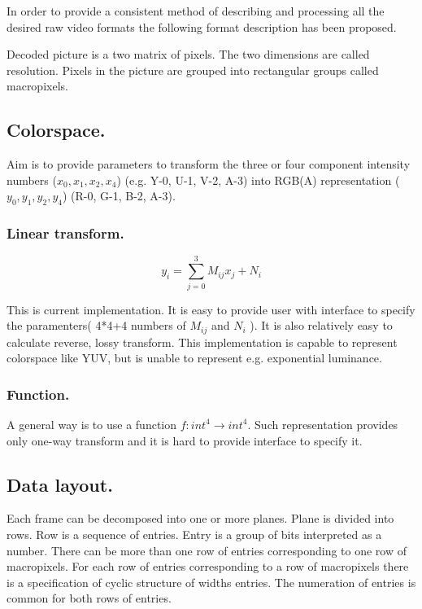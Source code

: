 In order to provide a consistent method of describing and processing all the desired raw video formats the following format description has been proposed.

Decoded picture is a two matrix of pixels. The two dimensions are called resolution. Pixels in the picture are grouped into rectangular groups called macropixels.

\subsection{Colorspace.}

Aim is to provide parameters to transform the three or four component intensity numbers ($x_0, x_1, x_2, x_4$) (e.g. Y-0, U-1, V-2, A-3) into RGB(A) representation ($y_0, y_1, y_2, y_4$) (R-0, G-1, B-2, A-3).

\subsubsection{Linear transform.}

\begin{displaymath}
y_i = \sum_{j=0}^3 M_{ij} x_j + N_i
\end{displaymath}

This is current implementation. It is easy to provide user with interface to specify the paramenters( 4*4+4 numbers of $M_{ij}$ and $N_i$ ). It is also relatively easy to calculate reverse, lossy transform. This implementation is capable to represent colorspace like YUV, but is unable to represent e.g. exponential luminance.

\subsubsection{Function.}

A general way is to use a function $f:int^4 \rightarrow int^4$. Such representation provides only one-way transform and it is hard to provide interface to specify it.

\subsection{Data layout.}

Each frame can be decomposed into one or more planes. Plane is divided into rows. Row is a sequence of entries. Entry is a group of bits interpreted as a number. There can be more than one row of entries corresponding to one row of macropixels. For each row of entries corresponding to a row of macropixels there is a specification of cyclic structure of widths entries. The numeration of entries is common for both rows of entries.

